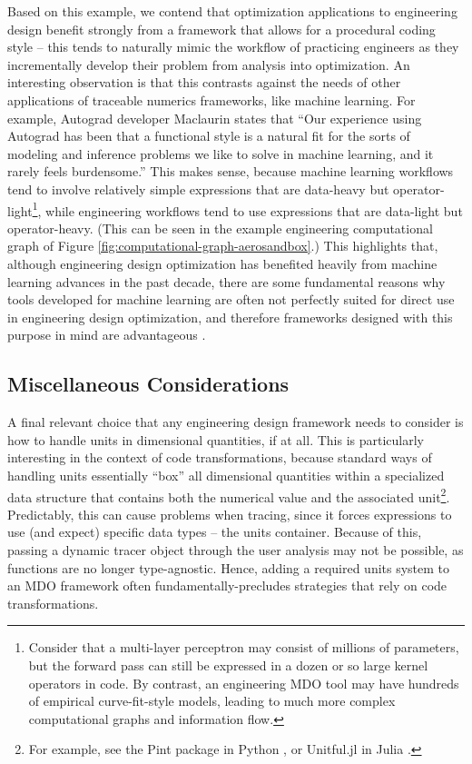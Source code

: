 Based on this example, we contend that optimization applications to engineering design benefit strongly from a framework that allows for a procedural coding style -- this tends to naturally mimic the workflow of practicing engineers as they incrementally develop their problem from analysis into optimization. An interesting observation is that this contrasts against the needs of other applications of traceable numerics frameworks, like machine learning. For example, Autograd developer Maclaurin \cite{maclaurin_modeling_2016} states that ``Our experience using Autograd has been that a functional style is a natural fit for the sorts of modeling and inference problems we like to solve in machine learning, and it rarely feels burdensome.'' This makes sense, because machine learning workflows tend to involve relatively simple expressions that are data-heavy but operator-light\footnote{Consider that a multi-layer perceptron may consist of millions of parameters, but the forward pass can still be expressed in a dozen or so large kernel operators in code. By contrast, an engineering MDO tool may have hundreds of empirical curve-fit-style models, leading to much more complex computational graphs and information flow.}, while engineering workflows tend to use expressions that are data-light but operator-heavy. (This can be seen in the example engineering computational graph of Figure \ref{fig:computational-graph-aerosandbox}.) This highlights that, although engineering design optimization has benefited heavily from machine learning advances in the past decade, there are some fundamental reasons why tools developed for machine learning are often not perfectly suited for direct use in engineering design optimization, and therefore frameworks designed with this purpose in mind are advantageous \cite{rackauckas_engineering_2021}.

\subsection{Miscellaneous Considerations} %

A final relevant choice that any engineering design framework needs to consider is how to handle units in dimensional quantities, if at all. This is particularly interesting in the context of code transformations, because standard ways of handling units essentially ``box'' all dimensional quantities within a specialized data structure that contains both the numerical value and the associated unit\footnote{For example, see the Pint package in Python \cite{pint}, or Unitful.jl in Julia \cite{unitful}.}. Predictably, this can cause problems when tracing, since it forces expressions to use (and expect) specific data types -- the units container. Because of this, passing a dynamic tracer object through the user analysis may not be possible, as functions are no longer type-agnostic. Hence, adding a required units system to an MDO framework often fundamentally-precludes strategies that rely on code transformations.

